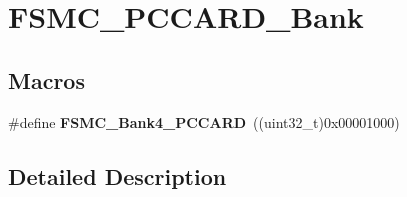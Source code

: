 \hypertarget{group___f_s_m_c___p_c_c_a_r_d___bank}{}\section{F\+S\+M\+C\+\_\+\+P\+C\+C\+A\+R\+D\+\_\+\+Bank}
\label{group___f_s_m_c___p_c_c_a_r_d___bank}
\subsection*{Macros}
\begin{DoxyCompactItemize}
\item 
\hypertarget{group___f_s_m_c___p_c_c_a_r_d___bank_gad08ce7c7afc462f3d9ef085b05d42387}{}\#define {\bfseries F\+S\+M\+C\+\_\+\+Bank4\+\_\+\+P\+C\+C\+A\+R\+D}~((uint32\+\_\+t)0x00001000)\label{group___f_s_m_c___p_c_c_a_r_d___bank_gad08ce7c7afc462f3d9ef085b05d42387}

\end{DoxyCompactItemize}


\subsection{Detailed Description}
